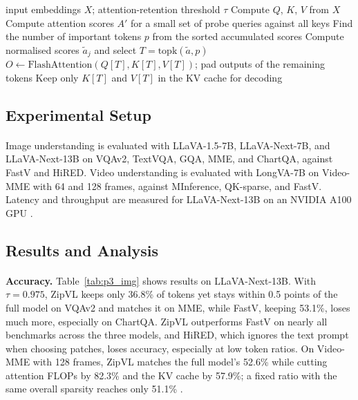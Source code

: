 \documentclass[12pt,a4paper,final]{extreport}
\begin{document}
\begin{algorithm}[htbp]
\caption{Prefill phase of ZipVL (adapted from \cite{p3})}\label{alg:p3}
\begin{algorithmic}[1]
\Require input embeddings $X$; attention-retention threshold $\tau$
\State Compute $Q$, $K$, $V$ from $X$
\State Compute attention scores $A'$ for a small set of probe queries against all keys
\State Find the number of important tokens $p$ from the sorted accumulated scores
\State Compute normalised scores $\tilde{a}_j$ and select $T=\mathrm{topk}(\tilde{a},p)$
\State $O\gets\mathrm{FlashAttention}(Q[T],K[T],V[T])$; pad outputs of the remaining tokens
\State Keep only $K[T]$ and $V[T]$ in the KV cache for decoding
\end{algorithmic}
\end{algorithm}

\subsection{Experimental Setup}

\paragraph{} Image understanding is evaluated with LLaVA-1.5-7B, LLaVA-Next-7B, and LLaVA-Next-13B on VQAv2, TextVQA, GQA, MME, and ChartQA, against FastV and HiRED. Video understanding is evaluated with LongVA-7B on Video-MME with 64 and 128 frames, against MInference, QK-sparse, and FastV. Latency and throughput are measured for LLaVA-Next-13B on an NVIDIA A100 GPU \cite{p3}.

\subsection{Results and Analysis}

\paragraph{} \textbf{Accuracy.} Table~\ref{tab:p3_img} shows results on LLaVA-Next-13B. With $\tau=0.975$, ZipVL keeps only 36.8\% of tokens yet stays within 0.5 points of the full model on VQAv2 and matches it on MME, while FastV, keeping 53.1\%, loses much more, especially on ChartQA. ZipVL outperforms FastV on nearly all benchmarks across the three models, and HiRED, which ignores the text prompt when choosing patches, loses accuracy, especially at low token ratios. On Video-MME with 128 frames, ZipVL matches the full model's 52.6\% while cutting attention FLOPs by 82.3\% and the KV cache by 57.9\%; a fixed ratio with the same overall sparsity reaches only 51.1\% \cite{p3}.
\end{document}
